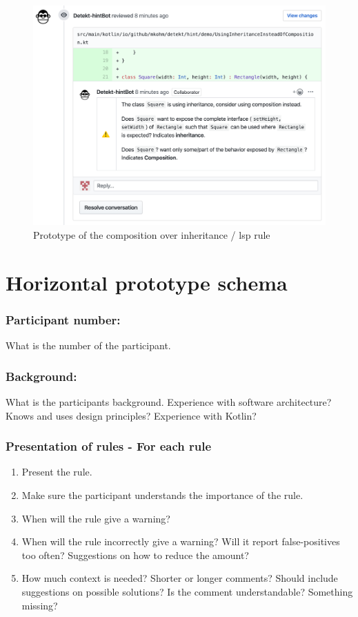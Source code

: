 \begin{figure}[h!]
    \centering
    \includegraphics[width=\textwidth]{../images/demo.png}
    \caption{Prototype of the composition over inheritance / \gls{lsp} rule}
    \label{fig:liskov}
\end{figure}

\clearpage

\section{Horizontal prototype schema}
\label{semi-structured-interview-schema}
\subsubsection*{Participant number:} What is the number of the participant.
\subsubsection*{Background:} What is the participants background. Experience with software architecture? Knows and uses design principles? Experience with Kotlin?
\subsubsection*{Presentation of rules - For each rule}
\begin{enumerate}
    \item Present the rule. 
    \item Make sure the participant understands the importance of the rule.
    \item When will the rule give a warning?
    \item When will the rule incorrectly give a warning? Will it report false-positives too often? Suggestions on how to reduce the amount?
    \item How much context is needed? Shorter or longer comments? Should include suggestions on possible solutions? Is the comment understandable? Something missing?
\end{enumerate}

